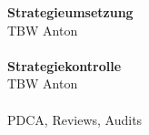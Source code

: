 \textbf{Strategieumsetzung}\\
TBW Anton\\\\

\textbf{Strategiekontrolle}\\
TBW Anton\\\\

PDCA, Reviews, Audits